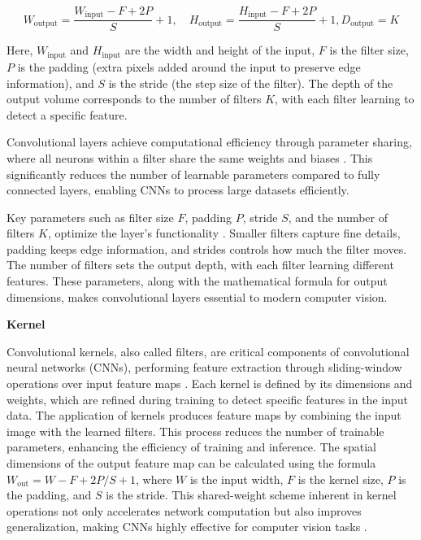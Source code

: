 \begin{equation}
    W_{\text{output}} = \frac{W_{\text{input}} - F + 2P}{S} + 1, \quad H_{\text{output}} = \frac{H_{\text{input}} - F + 2P}{S} + 1, 
    \label{conv_spatial}
    D_{\text{output}} = K
\end{equation}


Here, \( W_{\text{input}} \) and \( H_{\text{input}} \) are the width and height of the input, \( F \) is the filter size, \( P \) is the padding (extra pixels added around the input to preserve edge information), and \( S \) is the stride (the step size of the filter). The depth of the output volume corresponds to the number of filters \( K \), with each filter learning to detect a specific feature.

Convolutional layers achieve computational efficiency through parameter sharing, where all neurons within a filter share the same weights and biases \cite{cs231n_cnn}. This significantly reduces the number of learnable parameters compared to fully connected layers, enabling CNNs to process large datasets efficiently.

Key parameters such as filter size \(F\), padding \(P\), stride \(S\), and the number of filters \(K\), optimize the layer's functionality \cite{cs231n_cnn}. Smaller filters capture fine details, padding keeps edge information, and strides controls how much the filter moves. The number of filters sets the output depth, with each filter learning different features. These parameters, along with the mathematical formula for output dimensions, makes convolutional layers essential to modern computer vision.

\textbf{Kernel}

Convolutional kernels, also called filters, are critical components of convolutional neural networks (CNNs), performing feature extraction through sliding-window operations over input feature maps \cite{jain2020convolutions}. Each kernel is defined by its dimensions and weights, which are refined during training to detect specific features in the input data. The application of kernels produces feature maps by combining the input image with the learned filters. This process reduces the number of trainable parameters, enhancing the efficiency of training and inference. The spatial dimensions of the output feature map can be calculated using the formula \( W_{\text{out}} = W - F + 2P/S + 1 \), where \( W \) is the input width, \( F \) is the kernel size, \( P \) is the padding, and \( S \) is the stride. This shared-weight scheme inherent in kernel operations not only accelerates network computation but also improves generalization, making CNNs highly effective for computer vision tasks \cite{bhatt2021cnn}.

